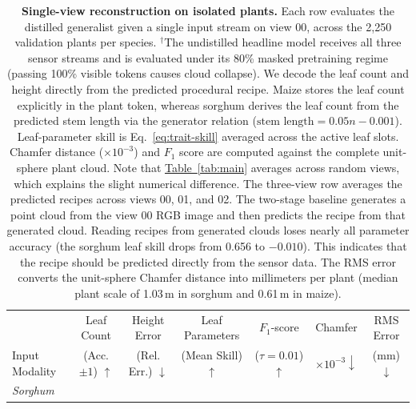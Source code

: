\documentclass[10pt,twocolumn,letterpaper]{article}
\newcommand{\tabref}[1]{\hyperref[#1]{Table~\ref*{#1}}}
\begin{document}
\begin{table}[t]
  \caption{\textbf{Single-view reconstruction on isolated plants.} Each row evaluates the distilled generalist given a single input stream on view 00, across the 2{,}250 validation plants per species. $^{\dagger}$The undistilled headline model receives all three sensor streams and is evaluated under its 80\% masked pretraining regime (passing 100\% visible tokens causes cloud collapse). We decode the leaf count and height directly from the predicted procedural recipe. Maize stores the leaf count explicitly in the plant token, whereas sorghum derives the leaf count from the predicted stem length via the generator relation ($\text{stem length} = 0.05n - 0.001$). Leaf-parameter skill is Eq.~\eqref{eq:trait-skill} averaged across the active leaf slots. Chamfer distance ($\times 10^{-3}$) and $F_1$ score are computed against the complete unit-sphere plant cloud. Note that \tabref{tab:main} averages across random views, which explains the slight numerical difference. The three-view row averages the predicted recipes across views 00, 01, and 02. The two-stage baseline generates a point cloud from the view 00 RGB image and then predicts the recipe from that generated cloud. Reading recipes from generated clouds loses nearly all parameter accuracy (the sorghum leaf skill drops from 0.656 to $-0.010$). This indicates that the recipe should be predicted directly from the sensor data. The RMS error converts the unit-sphere Chamfer distance into millimeters per plant (median plant scale of 1.03\,m in sorghum and 0.61\,m in maize).}
  \label{tab:regime1}
  \centering\scriptsize
  \setlength{\tabcolsep}{4.5pt}
  \begin{tabular}{l cc c ccc}
    \toprule
    & Leaf Count & Height Error & Leaf Parameters & $F_1$-score & Chamfer & RMS Error \\
    Input Modality & (Acc. $\pm 1$) $\uparrow$ & (Rel. Err.) $\downarrow$ & (Mean Skill) $\uparrow$ & ($\tau=0.01$) $\uparrow$ & $\times10^{-3}\downarrow$ & (mm) $\downarrow$ \\
    \midrule
    \multicolumn{7}{l}{\emph{Sorghum}} \\

\end{tabular}
\end{table}
\end{document}
